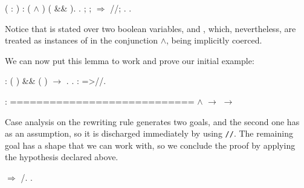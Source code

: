 \begin{coqdoccode}
\coqdocemptyline
\coqdocnoindent
{}  (  : ) :  ( \ensuremath{\land} ) ( \&\& ).\coqdoceol
\coqdocnoindent
{}.   ;  ; \ensuremath{\Rightarrow} //; . .\coqdoceol
\coqdocemptyline
\end{coqdoccode}


Notice that  is stated over two boolean variables,  and
, which, nevertheless, are treated as instances of  in the
conjunction \ensuremath{\land}, being implicitly coerced. 


We can now put this lemma to work and prove our initial example:


\begin{coqdoccode}
\coqdocemptyline
\coqdocnoindent
{}   : ( ) \&\& ( ) \ensuremath{\rightarrow}  .\coqdoceol
\coqdocnoindent
{}.\coqdoceol
\coqdocnoindent
{}: =>//.\coqdoceol
\coqdocemptyline
\end{coqdoccode}
\coqdoceol
\coqdocemptyline
\coqdocindent{1.00em}
 : \coqdoceol
\coqdocindent{1.00em}
============================\coqdoceol
\coqdocindent{1.50em}
  \ensuremath{\land}   \ensuremath{\rightarrow}  \ensuremath{\rightarrow}  

\coqdocemptyline


Case analysis on the rewriting rule  generates two goals, and
the second one has  as an assumption, so it is discharged
immediately by using \texttt{//}\ssrtl{//}. The remaining goal has a
shape that we can work with, so we conclude the proof by applying the
hypothesis  declared above.


\begin{coqdoccode}
\coqdocemptyline
\coqdocnoindent
{} \ensuremath{\Rightarrow}\coqdocvar{\_} /.\coqdoceol
\coqdocnoindent
{}.\coqdoceol
\coqdocemptyline
\end{coqdoccode}


